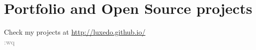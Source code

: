 \documentclass[11pt,a4paper,sans]{moderncv}        %
\begin{document}
\section{Portfolio and Open Source projects}
Check my projects at \url{http://luxedo.github.io/}\\
\textcolor{gray}{:wq}


\clearpage
\end{document}

